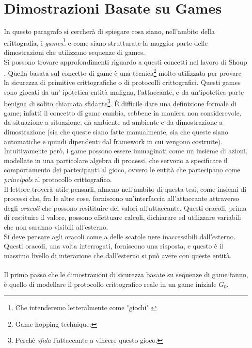\documentclass[a4paper,openright,twoside,12pt]{report}
\begin{document}
\section{Dimostrazioni Basate su Games}
In questo paragrafo si cercher\`a di spiegare cosa siano, nell'ambito della crittografia, i \emph{games}\footnote{Che intenderemo letteralmente come "giochi".} e come siano strutturate la
maggior parte delle dimostrazioni che utilizzano sequenze di games.\\Si possono trovare approfondimenti riguardo a questi concetti nel lavoro di Shoup \cite{shoup}.
Quella basata sul concetto di game \`e una tecnica\footnote{Game hopping technique.} molto utilizzata per provare la sicurezza di primitive crittografiche o di protocolli crittografici.
Questi games sono giocati da un' ipotetica entit\`a maligna, l'attaccante, e da un'ipotetica parte benigna di solito chiamata sfidante\footnote{Perch\`e \emph{sfida} l'attaccante a 
vincere questo gioco.}. 
\`E difficile dare una definizione formale di game; infatti il concetto di game cambia, sebbene in maniera non considerevole, da situazione a situazione, da ambiente ad ambiente e 
da dimostrazione a dimostrazione (sia che queste siano fatte manualmente, sia che queste siano automatiche e quindi dipendenti dal framework in cui vengono costruite).
Intuitivamente per\`o, i game possono essere immaginati come un insieme di azioni, modellate in una particolare algebra di processi, 
che servono a specificare il comportamento dei partecipanti al gioco, ovvero le entit\`a che partecipano come \emph{principals} al protocollo crittografico.\\
Il lettore trover\`a utile pensarli, almeno nell'ambito di questa tesi, come insiemi di processi che, fra le altre cose, forniscono un'interfaccia all'attaccante attraverso degli 
\emph{oracoli} che possono resitituire dei valori all'attaccante. Questi oracoli, prima di restituire il valore, possono effettuare calcoli, dichiarare ed utilizzare variabili che non saranno
visibili all'esterno.\\Si deve pensare agli oracoli come a delle scatole nere inaccessibili dall'esterno. Questi oracoli, una volta interrogati, forniscono una risposta,
e questo \`e il massimo livello di interazione che dall'esterno si pu\`o avere con queste entit\`a.\\ \\
Il primo passo che le dimostrazioni di sicurezza basate su sequenze di game fanno, \`e quello di modellare il protocollo crittografico reale in un game iniziale $G_0$.
\end{document}
